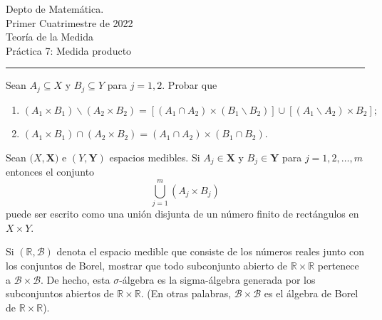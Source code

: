 \documentclass{book}
\newcommand{\rr}{\mathbb{R}}
\begin{document}


\begin{large}
\begin{bfseries} %
        \noindent Depto de Matem\'atica.\\
        Primer Cuatrimestre de 2022\\                                                                                                                                                                                                                                                                                                                                                
        Teoría de la Medida \\
        Práctica 7: Medida producto

\end{bfseries}
\end{large}
\par\noindent\rule{\textwidth}{.5pt}






\begin{ejer}{}
Sean $A_j \subseteq X$ y $B_j \subseteq Y$ para $j=1,2$. 
Probar que 
\begin{enumerate}
\item $
(A_1\times B_1) \backslash (A_2 \times B_2)=
[(A_1 \cap A_2) \times (B_1 \backslash B_2)] \cup [(A_1 \backslash A_2) \times B_2];
$
\item 
$
(A_1  \times B_1) \cap (A_2 \times B_2)=(A_1 \cap A_2)\times (B_1 \cap B_2).
$
\end{enumerate}
\end{ejer}

\begin{ejer}{}
Sean $(X,\boldsymbol{X)}$ e $(Y,\boldsymbol{Y})$ espacios medibles.
Si $A_j \in \boldsymbol{X}$ y $B_j \in \boldsymbol{Y}$ para $j=1,2,\ldots,m$ entonces el conjunto
\[
\bigcup\limits_{j=1}^{m} (A_j \times B_j)
\]
puede ser escrito como una unión disjunta de un número finito de rectángulos en $X \times Y$.
\end{ejer}


\begin{ejer}{}
 Si $(\rr,\mathscr{B})$ denota el espacio medible que consiste de los números reales junto con los conjuntos 
de Borel, mostrar que todo subconjunto abierto de $\rr\times \rr$ pertenece a $\mathscr{B}\times \mathscr{B}$.
De hecho, esta $\sigma$-álgebra es la sigma-álgebra generada por los subconjuntos abiertos de $\rr\times \rr$.
(En otras palabras, $\mathscr{B}\times \mathscr{B}$ es el álgebra de Borel de $\rr \times \rr$).
\end{ejer}
\end{document}
